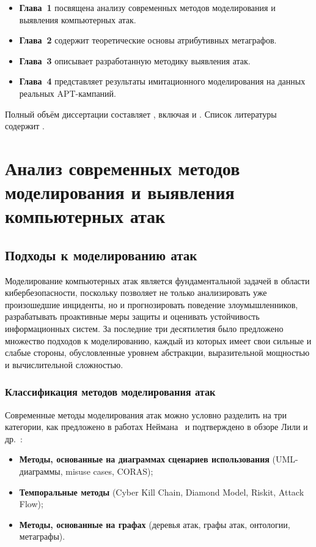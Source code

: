 \documentclass{article}
\begin{document}
\begin{itemize}
    \item \textbf{Глава~1} посвящена анализу современных методов моделирования и выявления компьютерных атак.  
    \item \textbf{Глава~2} содержит теоретические основы атрибутивных метаграфов.  
    \item \textbf{Глава~3} описывает разработанную методику выявления атак.  
    \item \textbf{Глава~4} представляет результаты имитационного моделирования на данных реальных APT-кампаний.
\end{itemize}

Полный объём диссертации составляет
, включая
 и
.
Список литературы содержит
.




\chapter{Анализ современных методов моделирования и выявления компьютерных атак}\label{ch:ch1}

\section{Подходы к моделированию атак}\label{sec:ch1/sec1}
Моделирование компьютерных атак является фундаментальной задачей в области кибербезопасности, поскольку позволяет не только анализировать уже произошедшие инциденты, но и прогнозировать поведение злоумышленников, разрабатывать проактивные меры защиты и оценивать устойчивость информационных систем. За последние три десятилетия было предложено множество подходов к моделированию, каждый из которых имеет свои сильные и слабые стороны, обусловленные уровнем абстракции, выразительной мощностью и вычислительной сложностью.

\subsection{Классификация методов моделирования атак}

Современные методы моделирования атак можно условно разделить на три категории, как предложено в работах Неймана~\cite{Neiman2024a,Neiman2024b,Neiman2024c} и подтверждено в обзоре Лили и др.~\cite{Lallie2019}:
\begin{itemize}
    \item \textbf{Методы, основанные на диаграммах сценариев использования} (UML-диаграммы, misuse cases, CORAS);
    \item \textbf{Темпоральные методы} (Cyber Kill Chain, Diamond Model, Riskit, Attack Flow);
    \item \textbf{Методы, основанные на графах} (деревья атак, графы атак, онтологии, метаграфы).
\end{itemize}
\end{document}

